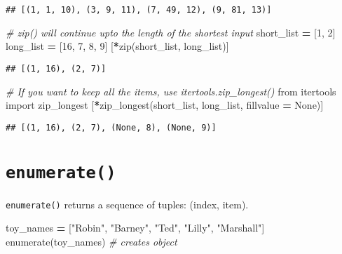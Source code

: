 \documentclass[
]{book}
\newenvironment{Shaded}{\begin{snugshade}}{\end{snugshade}}
\newcommand{\BuiltInTok}[1]{#1}
\newcommand{\CommentTok}[1]{\textcolor[rgb]{0.56,0.35,0.01}{\textit{#1}}}
\newcommand{\DecValTok}[1]{\textcolor[rgb]{0.00,0.00,0.81}{#1}}
\newcommand{\ImportTok}[1]{#1}
\newcommand{\NormalTok}[1]{#1}
\newcommand{\OperatorTok}[1]{\textcolor[rgb]{0.81,0.36,0.00}{\textbf{#1}}}
\newcommand{\StringTok}[1]{\textcolor[rgb]{0.31,0.60,0.02}{#1}}
\newcommand{\VariableTok}[1]{\textcolor[rgb]{0.00,0.00,0.00}{#1}}
\begin{document}
\begin{verbatim}
## [(1, 1, 10), (3, 9, 11), (7, 49, 12), (9, 81, 13)]
\end{verbatim}

\begin{Shaded}
\begin{Highlighting}[]
\CommentTok{\# zip() will continue upto the length of the shortest input}
\NormalTok{short\_list }\OperatorTok{=}\NormalTok{ [}\DecValTok{1}\NormalTok{, }\DecValTok{2}\NormalTok{]}
\NormalTok{long\_list }\OperatorTok{=}\NormalTok{ [}\DecValTok{16}\NormalTok{, }\DecValTok{7}\NormalTok{, }\DecValTok{8}\NormalTok{, }\DecValTok{9}\NormalTok{]}
\NormalTok{[}\OperatorTok{*}\BuiltInTok{zip}\NormalTok{(short\_list, long\_list)]}
\end{Highlighting}
\end{Shaded}

\begin{verbatim}
## [(1, 16), (2, 7)]
\end{verbatim}

\begin{Shaded}
\begin{Highlighting}[]
\CommentTok{\# If you want to keep all the items, use itertools.zip\_longest()}
\ImportTok{from}\NormalTok{ itertools }\ImportTok{import}\NormalTok{ zip\_longest}
\NormalTok{[}\OperatorTok{*}\NormalTok{zip\_longest(short\_list, long\_list, fillvalue }\OperatorTok{=} \VariableTok{None}\NormalTok{)]}
\end{Highlighting}
\end{Shaded}

\begin{verbatim}
## [(1, 16), (2, 7), (None, 8), (None, 9)]
\end{verbatim}

\hypertarget{enumerate}{%
\section{\texorpdfstring{\texttt{enumerate()}}{enumerate()}}\label{enumerate}}

\texttt{enumerate()} returns a sequence of tuples: (index, item).

\begin{Shaded}
\begin{Highlighting}[]
\NormalTok{toy\_names }\OperatorTok{=}\NormalTok{ [}\StringTok{"Robin"}\NormalTok{, }\StringTok{"Barney"}\NormalTok{, }\StringTok{"Ted"}\NormalTok{, }\StringTok{"Lilly"}\NormalTok{, }\StringTok{"Marshall"}\NormalTok{]}
\BuiltInTok{enumerate}\NormalTok{(toy\_names) }\CommentTok{\# creates object}
\end{Highlighting}
\end{Shaded}
\end{document}
